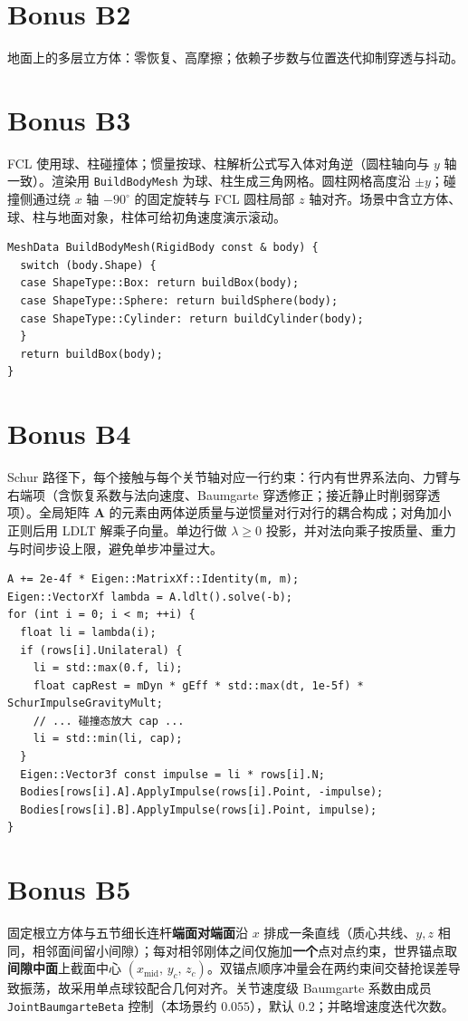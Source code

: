 \documentclass[UTF8,a4paper,11pt]{ctexart}
\begin{document}
\section{Bonus B2}
地面上的多层立方体：零恢复、高摩擦；依赖子步数与位置迭代抑制穿透与抖动。

\section{Bonus B3}
FCL 使用球、柱碰撞体；惯量按球、柱解析公式写入体对角逆（圆柱轴向与 $y$ 轴一致）。渲染用 \texttt{BuildBodyMesh} 为球、柱生成三角网格。圆柱网格高度沿 $\pm y$；碰撞侧通过绕 $x$ 轴 $-90^\circ$ 的固定旋转与 FCL 圆柱局部 $z$ 轴对齐。场景中含立方体、球、柱与地面对象，柱体可给初角速度演示滚动。

\begin{lstlisting}
MeshData BuildBodyMesh(RigidBody const & body) {
  switch (body.Shape) {
  case ShapeType::Box: return buildBox(body);
  case ShapeType::Sphere: return buildSphere(body);
  case ShapeType::Cylinder: return buildCylinder(body);
  }
  return buildBox(body);
}
\end{lstlisting}

\section{Bonus B4}
Schur 路径下，每个接触与每个关节轴对应一行约束：行内有世界系法向、力臂与右端项（含恢复系数与法向速度、Baumgarte 穿透修正；接近静止时削弱穿透项）。全局矩阵 $\mathbf{A}$ 的元素由两体逆质量与逆惯量对行对行的耦合构成；对角加小正则后用 LDLT 解乘子向量。单边行做 $\lambda\ge 0$ 投影，并对法向乘子按质量、重力与时间步设上限，避免单步冲量过大。

\begin{lstlisting}
A += 2e-4f * Eigen::MatrixXf::Identity(m, m);
Eigen::VectorXf lambda = A.ldlt().solve(-b);
for (int i = 0; i < m; ++i) {
  float li = lambda(i);
  if (rows[i].Unilateral) {
    li = std::max(0.f, li);
    float capRest = mDyn * gEff * std::max(dt, 1e-5f) * SchurImpulseGravityMult;
    // ... 碰撞态放大 cap ...
    li = std::min(li, cap);
  }
  Eigen::Vector3f const impulse = li * rows[i].N;
  Bodies[rows[i].A].ApplyImpulse(rows[i].Point, -impulse);
  Bodies[rows[i].B].ApplyImpulse(rows[i].Point, impulse);
}
\end{lstlisting}

\section{Bonus B5}
固定根立方体与五节细长连杆\textbf{端面对端面}沿 $x$ 排成一条直线（质心共线、$y,z$ 相同，相邻面间留小间隙）；每对相邻刚体之间仅施加\textbf{一个}点对点约束，世界锚点取\textbf{间隙中面}上截面中心 $(x_{\mathrm{mid}},\,y_c,\,z_c)$。双锚点顺序冲量会在两约束间交替抢误差导致振荡，故采用单点球铰配合几何对齐。关节速度级 Baumgarte 系数由成员 \texttt{JointBaumgarteBeta} 控制（本场景约 $0.055$），默认 $0.2$；并略增速度迭代次数。
\end{document}
